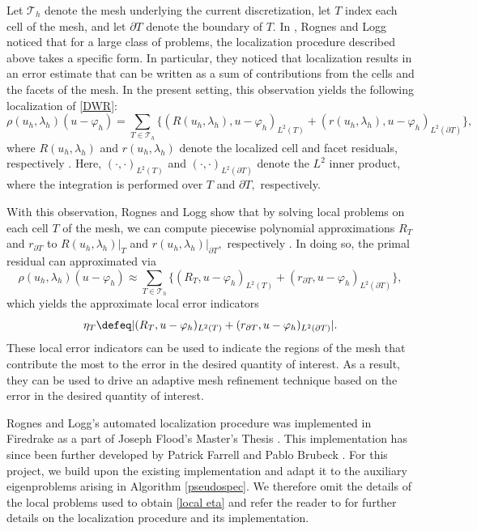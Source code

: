 Let $\mathcal{T}_h$ denote the mesh underlying the current discretization, let $T$ index each cell of the mesh, and let $\partial T$ denote the boundary of $T.$ In \cite{logg}, Rognes and Logg noticed that for a large class of problems, the localization procedure described above takes a specific form. In particular, they noticed that localization results in an error estimate that can be written as a sum of contributions from the cells and the facets of the mesh. In the present setting, this observation yields the following localization of \eqref{DWR}:
\begin{equation}
    \rho(u_h, \lambda_h)(u - \varphi_h) = \sum_{T \in \mathcal{T}_h} \{ (R(u_h, \lambda_h), u - \varphi_h)_{L^2(T)} + (r(u_h, \lambda_h), u-\varphi_h)_{L^2(\partial T)}\},
\end{equation}
where $R(u_h, \lambda_h)$ and $r(u_h, \lambda_h)$ denote the localized cell and facet residuals, respectively \cite{joe}. Here, $(\cdot, \cdot)_{L^2(T)}$ and $(\cdot, \cdot)_{L^2(\partial T)}$ denote the $L^2$ inner product, where the integration is performed over $T$ and $\partial T,$ respectively. 

With this observation, Rognes and Logg show that by solving local problems on each cell $T$ of the mesh, we can compute piecewise polynomial approximations $R_T$ and $r_{\partial T}$ to $R(u_h, \lambda_h) |_T$ and $r(u_h, \lambda_h)|_{\partial T},$ respectively \cite{logg}. In doing so, the primal residual can approximated via
\begin{equation}
    \rho(u_h, \lambda_h)(u - \varphi_h)  \approx  \sum_{T \in \mathcal{T}_h} \{ (R_T, u - \varphi_h)_{L^2(T)} + (r_{\partial T}, u-\varphi_h)_{L^2(\partial T)}\},
\end{equation}
which yields the approximate local error indicators
\begin{equation} \label{local eta}
    \eta_T \defeq |  (R_T, u - \varphi_h)_{L^2(T)} + (r_{\partial T}, u-\varphi_h)_{L^2(\partial T)} |.
\end{equation}
These local error indicators can be used to indicate the regions of the mesh that contribute the most to the error in the desired quantity of interest. As a result, they can be used to drive an adaptive mesh refinement technique based on the error in the desired quantity of interest. 

Rognes and Logg's automated localization procedure was implemented in Firedrake as a part of Joseph Flood's Master's Thesis \cite{joe}. This implementation has since been further developed by Patrick Farrell and Pablo Brubeck \cite{pablo}. For this project, we build upon the existing implementation and adapt it to the auxiliary eigenproblems arising in Algorithm \ref{pseudospec}. We therefore omit the details of the local problems used to obtain \eqref{local eta} and refer the reader to \cite{joe, logg, pablo} for further details on the localization procedure and its implementation.


